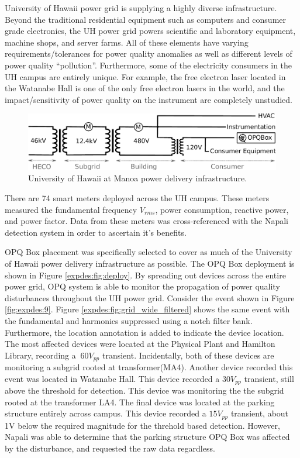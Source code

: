 University of Hawaii power grid is supplying a highly diverse infrastructure.
Beyond the traditional residential equipment such as computers and consumer grade electronics, the UH power grid powers scientific and laboratory equipment, machine shops, and server farms.
All of these elements have varying requirements/tolerances for power quality anomalies as well as different levels of power quality ``pollution''.
Furthermore, some of the electricity consumers in the UH campus are entirely unique.
For example, the free electron laser located in the Watanabe Hall is one of the only free electron lasers in the world, and the impact/sensitivity of power quality on the instrument are completely unstudied.
\begin{figure}[ht!]
    \centering
    \includegraphics[width=1\linewidth]{img/uh-grid.pdf}
    \caption{University of Hawaii at Manoa power delivery infrastructure.}
    \label{expdes:fig:1}
\end{figure}

There are 74 smart meters deployed across the UH campus.
These meters measured the fundamental frequency $V_{rms}$, power consumption, reactive power, and power factor.
Data from these meters was cross-referenced with the Napali detection system in order to ascertain it's benefits.

OPQ Box placement was specifically selected to cover as much of the University of Hawaii power delivery infrastructure as possible.
The OPQ Box deployment is shown in Figure \ref{expdes:fig:deploy}.
By spreading out devices across the entire power grid, OPQ system is able to monitor the propagation of power quality disturbances throughout the UH power grid.
Consider the event shown in Figure \ref{fig:expdes:9}.
Figure \ref{expdes:fig:grid_wide_filtered} shows the same event with the fundamental and harmonics suppressed using a notch filter bank.
Furthermore, the location annotation is added to indicate the device location.
The most affected devices were located at the Physical Plant and Hamilton Library, recording a $~60V_{pp}$ transient.
Incidentally, both of these devices are monitoring a subgrid rooted at transformer(MA4).
Another device recorded this event was located in Watanabe Hall.
This device recorded a $30V_{pp}$ transient, still above the threshold for detection.
This device was monitoring the the subgrid rooted at the transformer LA4.
The final device was located at the parking structure entirely across campus.
This device recorded a $15V_{pp}$ transient, about 1V below the required magnitude for the threhold based detection.
However, Napali was able to determine that the parking structure OPQ Box was affected by the disturbance, and requested the raw data regardless.

